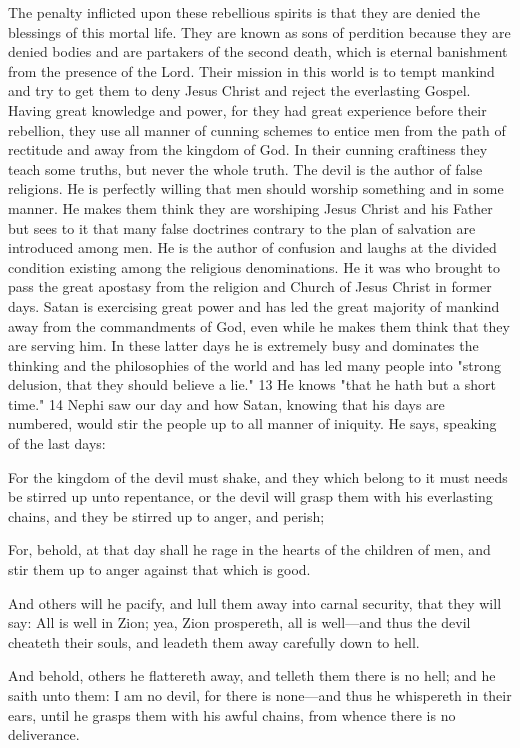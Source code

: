 The penalty inflicted upon these rebellious spirits is that they are denied the blessings of this
mortal life. They are known as sons of perdition because they are denied bodies and are
partakers of the second death, which is eternal banishment from the presence of the Lord.
Their mission in this world is to tempt mankind and try to get them to deny Jesus Christ and
reject the everlasting Gospel. Having great knowledge and power, for they had great
experience before their rebellion, they use all manner of cunning schemes to entice men from
the path of rectitude and away from the kingdom of God. In their cunning craftiness they
teach some truths, but never the whole truth. The devil is the author of false religions. He is
perfectly willing that men should worship something and in some manner. He makes them
think they are worshiping Jesus Christ and his Father but sees to it that many false doctrines
contrary to the plan of salvation are introduced among men. He is the author of confusion
and laughs at the divided condition existing among the religious denominations. He it was
who brought to pass the great apostasy from the religion and Church of Jesus Christ in
former days. Satan is exercising great power and has led the great majority of mankind away
from the commandments of God, even while he makes them think that they are serving him.
In these latter days he is extremely busy and dominates the thinking and the philosophies of
the world and has led many people into "strong delusion, that they should believe a lie." 13
He knows "that he hath but a short time." 14 Nephi saw our day and how Satan, knowing that
his days are numbered, would stir the people up to all manner of iniquity. He says, speaking
of the last days:

For the kingdom of the devil must shake, and they which belong to it must needs be stirred
up unto repentance, or the devil will grasp them with his everlasting chains, and they be
stirred up to anger, and perish;

For, behold, at that day shall he rage in the hearts of the children of men, and stir them up to
anger against that which is good.

And others will he pacify, and lull them away into carnal security, that they will say: All is
well in Zion; yea, Zion prospereth, all is well—and thus the devil cheateth their souls, and
leadeth them away carefully down to hell.

And behold, others he flattereth away, and telleth them there is no hell; and he saith unto
them: I am no devil, for there is none—and thus he whispereth in their ears, until he grasps
them with his awful chains, from whence there is no deliverance.

